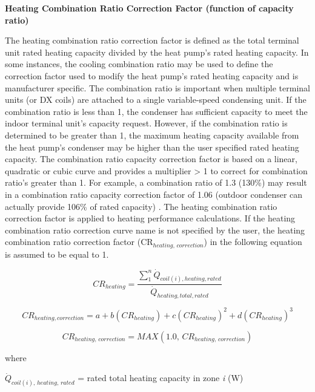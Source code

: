 \textbf{Heating Combination Ratio Correction Factor (function of capacity ratio)}

The heating combination ratio correction factor is defined as the total terminal unit rated heating capacity divided by the heat pump's rated heating capacity. In some instances, the cooling combination ratio may be used to define the correction factor used to modify the heat pump's rated heating capacity and is manufacturer specific. The combination ratio is important when multiple terminal units (or DX coils) are attached to a single variable-speed condensing unit. If the combination ratio is less than 1, the condenser has sufficient capacity to meet the indoor terminal unit's capacity request. However, if the combination ratio is determined to be greater than 1, the maximum heating capacity available from the heat pump's condenser may be higher than the user specified rated heating capacity. The combination ratio capacity correction factor is based on a linear, quadratic or cubic curve and provides a multiplier > 1 to correct for combination ratio's greater than 1. For example, a combination ratio of 1.3 (130\%) may result in a combination ratio capacity correction factor of 1.06 (outdoor condenser can actually provide 106\% of rated capacity) . The heating combination ratio correction factor is applied to heating performance calculations. If the heating combination ratio correction curve name is not specified by the user, the heating combination ratio correction factor (CR\(_{heating,\, correction}\)) in the following equation is assumed to be equal to 1.

\begin{equation}
  CR_{heating} = \frac{\sum\limits_1^n \dot{Q}_{coil(i),heating,rated}}{\dot{Q}_{heating,total,rated}}
\end{equation}

\begin{equation}
  CR_{heating,correction} = a + b \left( CR_{heating} \right) + c \left( CR_{heating} \right)^2 + d \left( CR_{heating} \right)^3
\end{equation}

\begin{equation}
  CR_{heating,\,correction} = MAX \left( 1.0,\,CR_{heating,\,correction} \right)
\end{equation}

where

\(\dot{Q}_{coil(i),\,heating,\,rated}\) = rated total heating capacity in zone \emph{i} (W)


